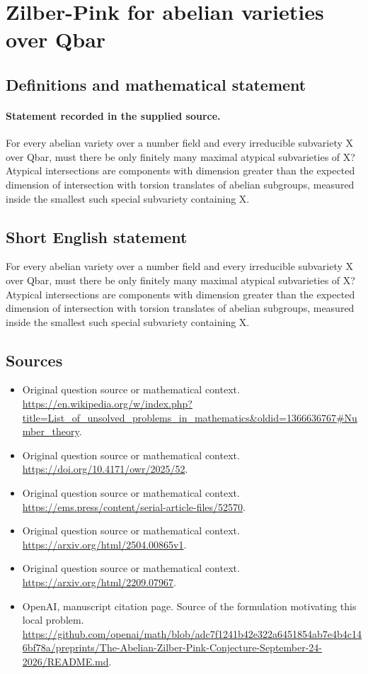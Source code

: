 \documentclass[11pt]{article}
\begin{document}
\section*{Zilber-Pink for abelian varieties over Qbar}\label{statement}
\subsection{Definitions and mathematical statement}
\paragraph{Statement recorded in the supplied source.}
For every abelian variety over a number field and every irreducible subvariety X over Qbar, must there be only finitely many maximal atypical subvarieties of X? Atypical intersections are components with dimension greater than the expected dimension of intersection with torsion translates of abelian subgroups, measured inside the smallest such special subvariety containing X.
\subsection{Short English statement}
For every abelian variety over a number field and every irreducible subvariety X over Qbar, must there be only finitely many maximal atypical subvarieties of X? Atypical intersections are components with dimension greater than the expected dimension of intersection with torsion translates of abelian subgroups, measured inside the smallest such special subvariety containing X.
\subsection{Sources}
\begin{itemize}
\item[S1] Original question source or mathematical context.
\url{https://en.wikipedia.org/w/index.php?title=List_of_unsolved_problems_in_mathematics&oldid=1366636767#Number_theory}.
\item[S2] Original question source or mathematical context.
\url{https://doi.org/10.4171/owr/2025/52}.
\item[S3] Original question source or mathematical context.
\url{https://ems.press/content/serial-article-files/52570}.
\item[S4] Original question source or mathematical context.
\url{https://arxiv.org/html/2504.00865v1}.
\item[S5] Original question source or mathematical context.
\url{https://arxiv.org/html/2209.07967}.
\item[S6] OpenAI, manuscript citation page. Source of the formulation motivating this local problem.
\url{https://github.com/openai/math/blob/adc7f1241b42e322a6451854ab7e4b4c146bf78a/preprints/The-Abelian-Zilber-Pink-Conjecture-September-24-2026/README.md}.
\end{itemize}
\end{document}
